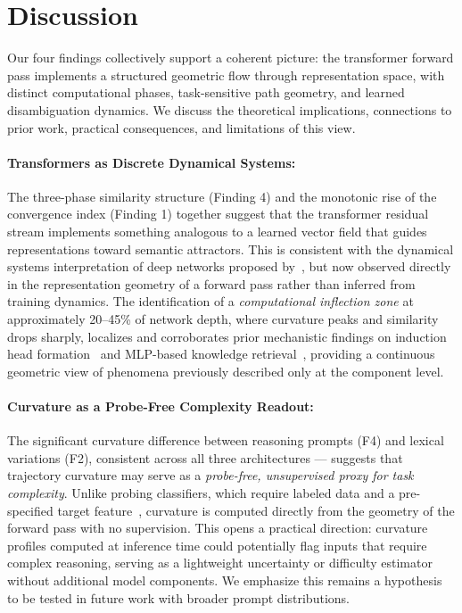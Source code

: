 \documentclass{article}
\begin{document}
\section{Discussion}
\label{sec:discussion}

Our four findings collectively support a coherent picture: 
the transformer forward pass implements a structured geometric 
flow through representation space, with distinct computational 
phases, task-sensitive path geometry, and learned disambiguation 
dynamics. We discuss the theoretical implications, connections 
to prior work, practical consequences, and limitations of 
this view.

\paragraph{Transformers as Discrete Dynamical Systems:} The three-phase similarity structure (Finding 4) and the monotonic rise of the convergence index (Finding 1) together suggest that the transformer residual stream implements something analogous to a learned vector field that guides representations toward semantic attractors. This is consistent with the dynamical systems interpretation of deep networks proposed by~\citet{e2017proposal}, but now observed directly in the representation geometry of a forward pass rather than inferred from training dynamics. The identification of a \textit{computational inflection zone} at approximately 20--45\% of network depth, where curvature peaks and similarity drops sharply, localizes and corroborates prior mechanistic findings on induction head formation~\cite{olsson2022incontext} and MLP-based knowledge retrieval~\cite{geva2021transformer}, providing a continuous geometric view of phenomena previously described only at the component level.

\paragraph{Curvature as a Probe-Free Complexity Readout:} The significant curvature difference between reasoning prompts (F4) and lexical variations (F2), consistent across all three architectures — suggests that trajectory curvature may serve as a \textit{probe-free, unsupervised proxy for task complexity}. Unlike probing classifiers, which require labeled data and a pre-specified target feature~\cite{alain2016understanding}, curvature is computed directly from the geometry of the forward pass with no supervision. This opens a practical direction: curvature profiles computed at inference time could potentially flag inputs that require complex reasoning, serving as a lightweight uncertainty or difficulty estimator without additional model components. We emphasize this remains a hypothesis to be tested in future work with broader prompt distributions.
\end{document}
